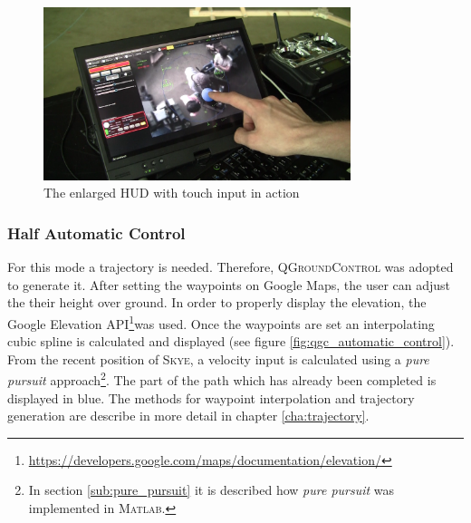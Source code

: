 \begin{figure}[H] %
	\begin{center}
		\includegraphics[width=0.8\textwidth]{graphics/TouchInput}
		\caption{The enlarged HUD with touch input in action}  
		\label{fig:touchInput}		
	\end{center}
\end{figure}


\subsubsection{Half Automatic Control}
\label{subsub:halfautomaticcontrol}
For this mode a trajectory is needed. Therefore, \textsc{QGroundControl} was adopted to generate it. After setting the waypoints on Google Maps, the user can adjust the their height over ground. In order to properly display the elevation, the Google Elevation API\footnote{\url{https://developers.google.com/maps/documentation/elevation/}}was used. Once the waypoints are set an interpolating cubic spline is calculated and displayed (see figure \ref{fig:qgc_automatic_control}). From the recent position of \textsc{Skye}, a velocity input is calculated using a \textit{pure pursuit} approach\footnote{In section \ref{sub:pure_pursuit} it is described how \textit{pure pursuit} was implemented in \textsc{Matlab}.}. The part of the path which has already been completed is displayed in blue. The methods for waypoint interpolation and trajectory generation are describe in more detail in chapter \ref{cha:trajectory}.%

